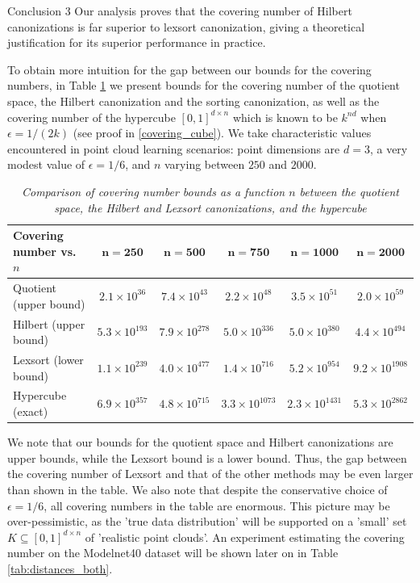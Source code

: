 \documentclass{article}
\theoremstyle{definition}
\theoremstyle{plain}
\begin{document}
\begin{conclusionbox}{Conclusion 3}
 Our analysis proves that the covering number of Hilbert canonizations is far superior to lexsort canonization, giving a theoretical justification for its superior performance in practice. 
\end{conclusionbox}


To obtain more intuition for the gap between our bounds for the covering numbers, in Table \ref{tab:bounds} we present bounds for the covering number of the quotient space, the Hilbert canonization and the sorting canonization, as well as the covering number of the hypercube $[0,1]^{d\times n}$ which is known to be $k^{nd}$ when $\epsilon=1/(2k)$ (see proof in \ref{covering_cube}). We take characteristic values encountered in point cloud learning scenarios:  point dimensions are $d=3$, a very modest value of $\epsilon=1/6$, and $n$ varying between $250$ and $2000$. 

\renewcommand{\arraystretch}{1.3} %
\begin{table}[h]
\centering
\label{tab:bounds}
\caption{\it Comparison of covering number bounds as a function $n$ between the quotient space,  the Hilbert and Lexsort canonizations, and the hypercube}
\begin{tabular}{lccccc}
\hline
 \textbf{Covering number vs. $n$} & $\mathbf{n=250}$ & $\mathbf{n=500}$ & $\mathbf{n=750}$ & $\mathbf{n=1000}$& $\mathbf{n=2000}$ \\ \hline
Quotient (upper bound) & $2.1 \times 10^{36}$  & $7.4 \times 10^{43}$  & $2.2 \times 10^{48}$  & $3.5 \times 10^{51}$ & $2.0 \times 10^{59}$  \\
Hilbert (upper bound) & $5.3 \times 10^{193}$ & $7.9 \times 10^{278}$ & $5.0 \times 10^{336}$ & $5.0 \times 10^{380}$& $4.4\times 10^{494}$ \\
Lexsort (lower bound) & $1.1 \times 10^{239}$ & $4.0 \times 10^{477}$ & $1.4 \times 10^{716}$ & $5.2 \times 10^{954}$ & $9.2\times 10^{1908}$ \\
Hypercube (exact) & $6.9\times 10^{357}$ & $4.8\times 10^{715}$ & $3.3\times 10^{1073}$ & $2.3\times 10^{1431}$ & $5.3 \times 10^{2862}$\\
 \hline
\end{tabular}
\end{table}
We note that our bounds for the quotient space and Hilbert canonizations are upper bounds, while the Lexsort bound is a lower bound. Thus, the gap between the covering number of Lexsort and that of the other methods may be even larger than shown in the table. We also note that despite the conservative choice of $\epsilon=1/6$, all covering numbers in the table are enormous. This picture may be over-pessimistic, as the 'true data distribution' will be supported on a 'small' set $K\subseteq [0,1]^{d\times n} $ of 'realistic point clouds'. An experiment estimating the covering number on the Modelnet40 dataset will be shown later on in Table \ref{tab:distances_both}.
\end{document}
